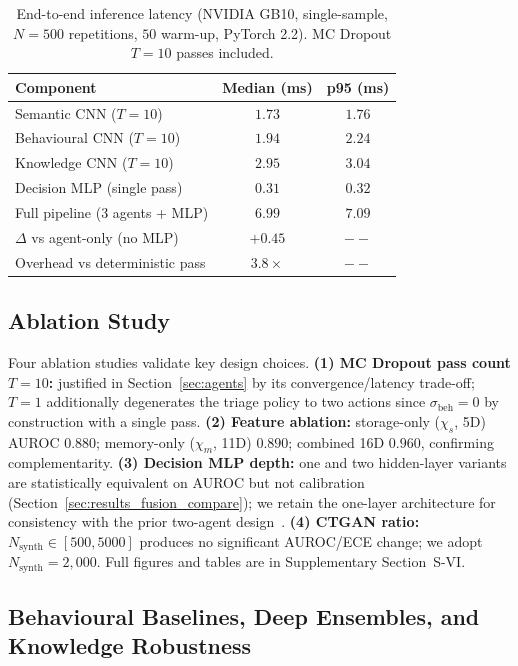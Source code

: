 \documentclass[journal]{IEEEtran}
\begin{document}
\begin{table}[t]
\centering
\footnotesize
\caption{End-to-end inference latency (NVIDIA GB10, single-sample,
  $N{=}500$ repetitions, $50$ warm-up, PyTorch 2.2).
  MC Dropout $T{=}10$ passes included.
}
\label{tab:latency}
\setlength{\tabcolsep}{5pt}
\begin{tabular}{lcc}
\toprule
Component & Median (ms) & p95 (ms) \\
\midrule
Semantic CNN ($T{=}10$)         & $1.73$ & $1.76$ \\
Behavioural CNN ($T{=}10$)      & $1.94$ & $2.24$ \\
Knowledge CNN ($T{=}10$)        & $2.95$ & $3.04$ \\
Decision MLP (single pass)      & $0.31$ & $0.32$ \\
\midrule
Full pipeline (3 agents + MLP)  & $6.99$ & $7.09$ \\
\midrule
$\Delta$ vs agent-only (no MLP) & $+0.45$ & $--$ \\
Overhead vs deterministic pass  & $3.8\times$ & $--$ \\
\bottomrule
\end{tabular}
\end{table}

\subsection{Ablation Study}\label{sec:ablation}

Four ablation studies validate key design choices.
\textbf{(1) MC Dropout pass count $T{=}10$:} justified in
Section~\ref{sec:agents} by its convergence/latency trade-off; $T{=}1$
additionally degenerates the triage policy to two actions since
$\sigma_{\text{beh}}{=}0$ by construction with a single pass.
\textbf{(2) Feature ablation:} storage-only ($\chi_s$, 5D) AUROC $0.880$;
memory-only ($\chi_m$, 11D) $0.890$; combined 16D $\mathbf{0.960}$,
confirming complementarity.
\textbf{(3) Decision MLP depth:} one and two hidden-layer variants are
statistically equivalent on AUROC but not calibration
(Section~\ref{sec:results_fusion_compare}); we retain the one-layer
architecture for consistency with the prior two-agent
design~\cite{kabuye2026sabre}.
\textbf{(4) CTGAN ratio:} $N_{\text{synth}} \in [500,5000]$ produces no
significant AUROC/ECE change; we adopt $N_{\text{synth}}{=}2{,}000$.
Full figures and tables are in Supplementary Section~S-VI.

\subsection{Behavioural Baselines, Deep Ensembles, and Knowledge Robustness}\label{sec:results_extra}
\end{document}
